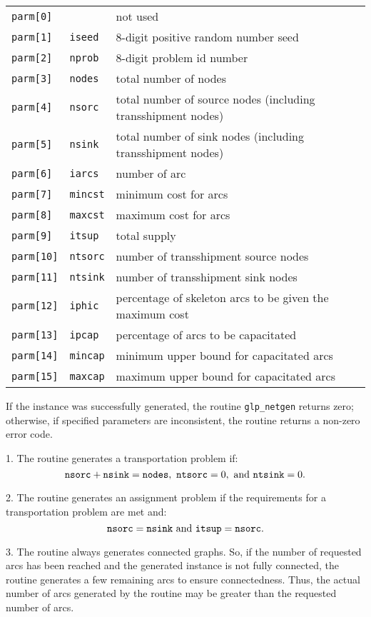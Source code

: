 \documentclass[11pt]{report}
\def\para#1{\noindent{\bf#1}}
\def\returns{\para{Returns}}
\begin{document}
\begin{tabular}{@{}lll@{}}
\verb|parm[0] |&             &not used\\
\verb|parm[1] |&\verb|iseed |&8-digit positive random number seed\\
\verb|parm[2] |&\verb|nprob |&8-digit problem id number\\
\verb|parm[3] |&\verb|nodes |&total number of nodes\\
\verb|parm[4] |&\verb|nsorc |&total number of source nodes
(including transshipment nodes)\\
\verb|parm[5] |&\verb|nsink |&total number of sink nodes
(including transshipment nodes)\\
\verb|parm[6] |&\verb|iarcs |&number of arc\\
\verb|parm[7] |&\verb|mincst|&minimum cost for arcs\\
\verb|parm[8] |&\verb|maxcst|&maximum cost for arcs\\
\verb|parm[9] |&\verb|itsup |&total supply\\
\verb|parm[10]|&\verb|ntsorc|&number of transshipment source nodes\\
\verb|parm[11]|&\verb|ntsink|&number of transshipment sink nodes\\
\verb|parm[12]|&\verb|iphic |&percentage of skeleton arcs to be given
the maximum cost\\
\verb|parm[13]|&\verb|ipcap |&percentage of arcs to be capacitated\\
\verb|parm[14]|&\verb|mincap|&minimum upper bound for capacitated arcs\\
\verb|parm[15]|&\verb|maxcap|&maximum upper bound for capacitated arcs\\
\end{tabular}

\returns

If the instance was successfully generated, the routine
\verb|glp_netgen| returns zero; otherwise, if specified parameters are
inconsistent, the routine returns a non-zero error code.

\para{Notes}

1. The routine generates a transportation problem if:
$${\tt nsorc}+{\tt nsink}={\tt nodes},
\  {\tt ntsorc}=0,\ \mbox{and}\ {\tt ntsink}=0.$$

2. The routine generates an assignment problem if the requirements for
a transportation problem are met and:
$${\tt nsorc}={\tt nsink}\ \mbox{and}\ {\tt itsup}={\tt nsorc}.$$

3. The routine always generates connected graphs. So, if the number of
requested arcs has been reached and the generated instance is not fully
connected, the routine generates a few remaining arcs to ensure
connectedness. Thus, the actual number of arcs generated by the routine
may be greater than the requested number of arcs.
\end{document}
